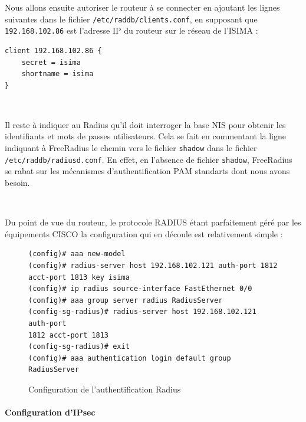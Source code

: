 Nous allons ensuite autoriser le routeur à se connecter en ajoutant les lignes suivantes dans le fichier \verb|/etc/raddb/clients.conf|, en supposant que \verb|192.168.102.86| est l'adresse IP du routeur sur le réseau de l'ISIMA :
\begin{center}
		\begin{minipage}{0.9\textwidth}
			\begin{lstlisting}[frame=trBL]
client 192.168.102.86 {
	secret = isima
	shortname = isima
}
			\end{lstlisting}
		\end{minipage}
\end{center}
~

Il reste à indiquer au Radius qu'il doit interroger la base NIS pour obtenir les identifiants et mots de passes utilisateurs. Cela se fait en commentant la ligne indiquant à FreeRadius le chemin vers le fichier \verb|shadow| dans le fichier \verb|/etc/raddb/radiusd.conf|. En effet, en l'absence de fichier \verb|shadow|, FreeRadius se rabat sur les mécanismes d'authentification PAM standarts dont nous avons besoin.

~

Du point de vue du routeur, le protocole RADIUS étant parfaitement géré par les équipements CISCO la configuration qui en découle est relativement simple :

\begin{figure}[H]
	\begin{center}
		\begin{minipage}{0.90\textwidth}
			\begin{lstlisting}[frame=trBL]
(config)# aaa new-model
(config)# radius-server host 192.168.102.121 auth-port 1812
acct-port 1813 key isima
(config)# ip radius source-interface FastEthernet 0/0
(config)# aaa group server radius RadiusServer
(config-sg-radius)# radius-server host 192.168.102.121 auth-port
1812 acct-port 1813
(config-sg-radius)# exit
(config)# aaa authentication login default group RadiusServer
			\end{lstlisting}
		\end{minipage}
	\end{center}
	\caption{Configuration de l'authentification Radius}
	\label{configuration_authentification_radius}
\end{figure}


\paragraph{Configuration d'IPsec}
~

